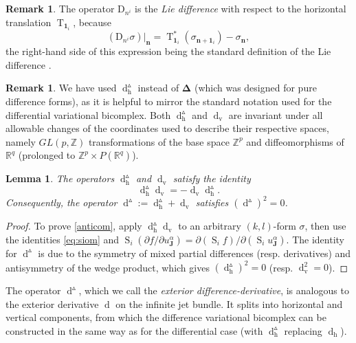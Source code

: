 \documentclass[11pt]{article} %
\numberwithin{equation}{section}
\newcommand{\es}{\operatorname{S}}
\newcommand{\te}{\operatorname{T}}
\newcommand{\upd}{\operatorname{d}}
\newcommand{\uph}{\operatorname{h}}
\newcommand{\upv}{\operatorname{v}}
\newcommand{\p}{\partial}
\newcommand{\dv}{\upd_{\upv}\!}
\newcommand{\diffi}{\mathrm{D}_{n^i}}
\newcommand{\mbn}{\mathbf{n}}
\newcommand{\mbJ}{\mathbf{J}}
\newcommand{\bD}{\bm{\Delta}}
\newcommand{\dD}{\upd^{\vartriangle}}
\newcommand{\dDh}{\upd^{\vartriangle}_{\uph}}
\theoremstyle{plain}
\newtheorem{lem}[thm]{Lemma}
\theoremstyle{definition}
\newtheorem{rem}[defn]{Remark}
\begin{document}
\begin{rem}
The operator $\diffi$ is the \textit{Lie difference} with respect to the horizontal translation $\te_{\mathbf{1}_i}$, because
\[
(\diffi \sigma)|_\mbn =\te_{\mathbf{1}_i}^*(\sigma_{\mbn+\mathbf{1}_i})-\sigma_{\mbn},
\]
the right-hand side of this expression being the standard definition of the Lie difference \cite{CramPir1987}.
\end{rem}
\begin{rem}
We have used $\dDh$ instead of $\bD$ (which was designed for pure difference forms), as it is helpful to mirror the standard notation used for the differential variational bicomplex. Both $\dDh$ and $\dv $ are invariant under all  allowable changes of the coordinates used to describe their respective spaces, namely $GL(p,\mathbb{Z})$ transformations of the base space $\mathbb{Z}^p$ and diffeomorphisms of $\mathbb{R}^q$ (prolonged to $\mathbb{Z}^p\times P(\mathbb{R}^q)$). 
\end{rem}


\begin{lem}\label{lemdD}
	The operators $\dDh$ and $\dv $ satisfy the identity
	\begin{equation}\label{anticom}
	\dDh\dv =-\dv \dDh.
	\end{equation}
	Consequently, the operator $\dD:=\dDh+\dv $ satisfies $(\dD)^2=0$.
\end{lem}
\begin{proof}
	To prove \eqref{anticom}, apply $\dDh\dv $ to an arbitrary $(k,l)$-form $\sigma$, then use the identities \eqref{eq:siom} and $\es_i(\p f/\p u^\alpha_{\mbJ})=\p (\es_i\! f)/\p (\es_i\! u^\alpha_{\mbJ})$. The identity for $\dD$ is due to the symmetry of mixed partial differences (resp. derivatives) and antisymmetry of the wedge product, which gives $(\dDh)^2=0$ (resp. $\upd_{\upv}^2=0$).
\end{proof}

The operator $\dD$, which we call the \textit{exterior difference-derivative}, is analogous to the exterior derivative $\upd$ on the infinite jet bundle. It splits into horizontal and vertical components, from which the difference variational bicomplex can be constructed in the same way as for the differential case (with $\dDh$ replacing $\upd_{\uph}$).
\end{document}
